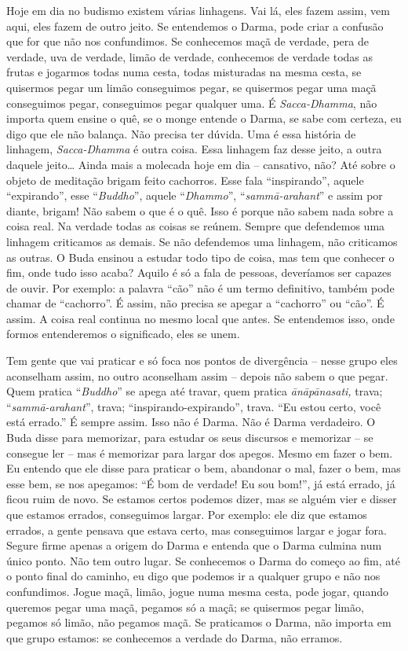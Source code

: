 Hoje em dia no budismo existem várias linhagens. Vai lá, eles fazem
assim, vem aqui, eles fazem de outro jeito. Se entendemos o Darma, pode
criar a confusão que for que não nos confundimos. Se conhecemos maçã de
verdade, pera de verdade, uva de verdade, limão de verdade, conhecemos
de verdade todas as frutas e jogarmos todas numa cesta, todas
misturadas na mesma cesta, se quisermos pegar um limão conseguimos
pegar, se quisermos pegar uma maçã conseguimos pegar, conseguimos pegar
qualquer uma. É \textit{Sacca-Dhamma}, não importa quem ensine o quê,
se o monge entende o Darma, se sabe com certeza, eu digo que ele não
balança. Não precisa ter dúvida. Uma é essa história de linhagem,
\textit{Sacca-Dhamma} é outra coisa. Essa linhagem faz desse jeito, a
outra daquele jeito… Ainda mais a molecada hoje em dia – cansativo,
não? Até sobre o objeto de meditação brigam feito cachorros. Esse fala
“inspirando”, aquele “expirando”, esse “\textit{Buddho}”, aquele
“\textit{Dhammo}”, “\textit{samm\=a-arahant}” e assim por diante,
brigam! Não sabem o que é o quê. Isso é porque não sabem nada sobre a
coisa real. Na verdade todas as coisas se reúnem. Sempre que defendemos
uma linhagem criticamos as demais. Se não defendemos uma linhagem, não
criticamos as outras. O Buda ensinou a estudar todo tipo de coisa, mas
tem que conhecer o fim, onde tudo isso acaba? Aquilo é só a fala de
pessoas, deveríamos ser capazes de ouvir. Por exemplo: a palavra “cão”
não é um termo definitivo, também pode chamar de “cachorro”. É assim,
não precisa se apegar a “cachorro” ou “cão”. É assim. A coisa real
continua no mesmo local que antes. Se entendemos isso, onde formos
entenderemos o significado, eles se unem. 

Tem gente que vai praticar e só foca nos pontos de divergência –
nesse grupo eles aconselham assim, no outro aconselham assim – depois
não sabem o que pegar. Quem pratica “\textit{Buddho}” se apega até
travar, quem pratica \textit{\=an\=ap\=anasati, }trava;
“\textit{samm\=a-arahant}”, trava; “inspirando-expirando”, trava. “Eu
estou certo, você está errado.” É sempre assim. Isso não é Darma. Não é
Darma verdadeiro. O Buda disse para memorizar, para estudar os seus
discursos e memorizar – se consegue ler – mas é memorizar para largar
dos apegos. Mesmo em fazer o bem. Eu entendo que ele disse para
praticar o bem, abandonar o mal, fazer o bem, mas esse bem, se nos
apegamos: “É bom de verdade! Eu sou bom!”, já está errado, já ficou
ruim de novo. Se estamos certos podemos dizer, mas se alguém vier e
disser que estamos errados, conseguimos largar. Por exemplo: ele diz
que estamos errados, a gente pensava que estava certo, mas conseguimos
largar e jogar fora. Segure firme apenas a origem do Darma e entenda
que o Darma culmina num único ponto. Não tem outro lugar. Se conhecemos
o Darma do começo ao fim, até o ponto final do caminho, eu digo que
podemos ir a qualquer grupo e não nos confundimos. Jogue maçã, limão,
jogue numa mesma cesta, pode jogar, quando queremos pegar uma maçã,
pegamos só a maçã; se quisermos pegar limão, pegamos só limão, não
pegamos maçã. Se praticamos o Darma, não importa em que grupo estamos:
se conhecemos a verdade do Darma, não erramos. 

